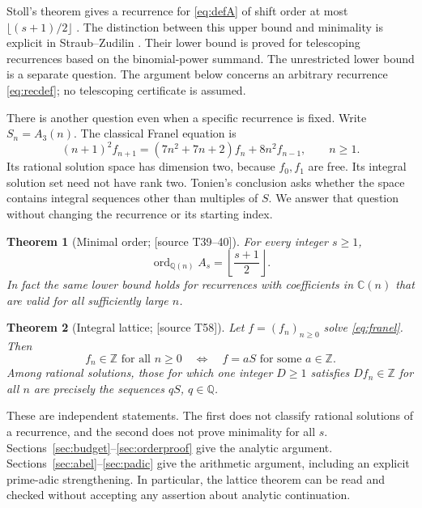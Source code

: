 \documentclass[11pt,a4paper]{article}
\newtheorem{theorem}{Theorem}[section]
\theoremstyle{definition}\newtheorem{definition}[theorem]{Definition}
\theoremstyle{remark}\newtheorem{remark}[theorem]{Remark}
\newcommand{\Q}{\mathbb Q}\newcommand{\Z}{\mathbb Z}\newcommand{\N}{\mathbb N}\newcommand{\R}{\mathbb R}\newcommand{\C}{\mathbb C}
\newcommand{\sourceT}[1]{\textup{[source T#1]}}
\begin{document}
Stoll's theorem gives a recurrence for \eqref{eq:defA} of shift order at most
$\lfloor(s+1)/2\rfloor$ \cite{Stoll}. The distinction between this upper bound
and minimality is explicit in Straub--Zudilin \cite{SZ}. Their lower bound is
proved for telescoping recurrences based on the binomial-power summand. The
unrestricted lower bound is a separate question. The argument below concerns
an arbitrary recurrence \eqref{eq:recdef}; no telescoping certificate is assumed.

There is another question even when a specific recurrence is fixed. Write
$S_n=A_3(n)$. The classical Franel equation is
\begin{equation}\label{eq:franel}
 (n+1)^2 f_{n+1}=(7n^2+7n+2)f_n+8n^2f_{n-1},\qquad n\ge1.
\end{equation}
Its rational solution space has dimension two, because $f_0,f_1$ are free.
Its integral solution set need not have rank two. Tonien's conclusion
\cite{Tonien} asks whether the space contains integral sequences other than
multiples of $S$. We answer that question without changing the recurrence or
its starting index.

\begin{theorem}[Minimal order; \sourceT{39--40}]\label{thm:mainorder}
For every integer $s\ge1$,
\[
 \operatorname{ord}_{\Q(n)} A_s=\left\lfloor\frac{s+1}{2}\right\rfloor.
\]
In fact the same lower bound holds for recurrences with coefficients in
$\C(n)$ that are valid for all sufficiently large $n$.
\end{theorem}

\begin{theorem}[Integral lattice; \sourceT{58}]\label{thm:mainlattice}
Let $f=(f_n)_{n\ge0}$ solve \eqref{eq:franel}. Then
\[
 f_n\in\Z\text{ for all }n\ge0
 \quad\Longleftrightarrow\quad f=aS\text{ for some }a\in\Z.
\]
Among rational solutions, those for which one integer $D\ge1$ satisfies
$Df_n\in\Z$ for all $n$ are precisely the sequences $qS$, $q\in\Q$.
\end{theorem}

These are independent statements. The first does not classify rational
solutions of a recurrence, and the second does not prove minimality for all
$s$. Sections~\ref{sec:budget}--\ref{sec:orderproof} give the analytic argument.
Sections~\ref{sec:abel}--\ref{sec:padic} give the arithmetic argument, including
an explicit prime-adic strengthening. In particular, the lattice theorem can
be read and checked without accepting any assertion about analytic continuation.
\end{document}
